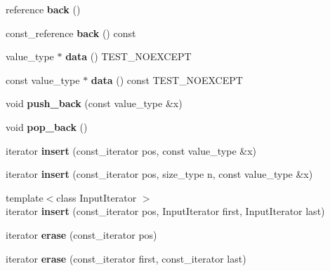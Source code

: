 \begin{DoxyCompactItemize}
reference {\bfseries back} ()
\item 
\mbox{\label{classnasty__vector_a83f4a0ea161e63dd1bc0b55b9f16685f}} 
const\+\_\+reference {\bfseries back} () const
\item 
\mbox{\label{classnasty__vector_af3593ad56daa6b4842e1c2170e5e37a8}} 
value\+\_\+type $\ast$ {\bfseries data} () T\+E\+S\+T\+\_\+\+N\+O\+E\+X\+C\+E\+PT
\item 
\mbox{\label{classnasty__vector_ad685cd41add4bc5925bc7c47c6c00889}} 
const value\+\_\+type $\ast$ {\bfseries data} () const T\+E\+S\+T\+\_\+\+N\+O\+E\+X\+C\+E\+PT
\item 
\mbox{\label{classnasty__vector_a36bf88ae4fafa81c538e0ae2aadd899f}} 
void {\bfseries push\+\_\+back} (const value\+\_\+type \&x)
\item 
\mbox{\label{classnasty__vector_a39642125c6063a7e55e4bcd8f9155d48}} 
void {\bfseries pop\+\_\+back} ()
\item 
\mbox{\label{classnasty__vector_aaa49a5127f43f28818842225295f6655}} 
iterator {\bfseries insert} (const\+\_\+iterator pos, const value\+\_\+type \&x)
\item 
\mbox{\label{classnasty__vector_ae16b5921a3f4d5fff3811788b3efc3da}} 
iterator {\bfseries insert} (const\+\_\+iterator pos, size\+\_\+type n, const value\+\_\+type \&x)
\item 
\mbox{\label{classnasty__vector_a605b9cc899d260a61586039c015d6397}} 
{\footnotesize template$<$class Input\+Iterator $>$ }\\iterator {\bfseries insert} (const\+\_\+iterator pos, Input\+Iterator first, Input\+Iterator last)
\item 
\mbox{\label{classnasty__vector_a9f8864132a1ecf742d8bcaa846d2b1a8}} 
iterator {\bfseries erase} (const\+\_\+iterator pos)
\item 
\mbox{\label{classnasty__vector_a64d7fc6e294e301782c2fc99d5751d0c}} 
iterator {\bfseries erase} (const\+\_\+iterator first, const\+\_\+iterator last)

\end{DoxyCompactItemize}
